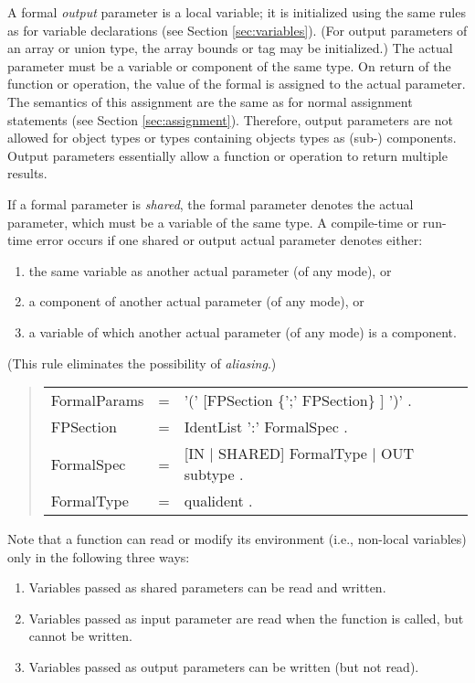 \documentclass[10pt]{article}
\newenvironment{grammar}
{\begin{quote} \begin{tabular}{p{3.8cm} l l}}
{\end{tabular}\end{quote}}
\begin{document}
A formal {\em output} parameter is a local variable;
it is initialized using the same rules as for variable declarations
(see Section \ref{sec:variables}).
(For output parameters of an array or union type, the array bounds 
or tag may be initialized.)
The actual parameter must be a variable or component of the same type.
On return of the function or operation,
the value of the formal is assigned to the actual parameter.
The semantics of this assignment are the same as for normal assignment
statements (see Section \ref{sec:assignment}).
Therefore, output parameters are not allowed for object types or types
containing objects types as (sub-) components.
Output parameters essentially allow a function or operation to return multiple
results.

If a formal parameter is {\em shared}, the formal parameter
denotes the actual parameter, which must be a variable of the same type.
A compile-time or run-time error occurs if
one shared or output actual parameter denotes either:
\begin{enumerate}
\item
the same variable as another actual parameter (of any mode), or
\item
a component of another actual parameter (of any mode), or
\item
a variable of which another actual parameter (of any mode) is a component.
\end{enumerate}

(This rule eliminates the possibility of {\em aliasing}.)
\begin{grammar}
FormalParams & = & '(' [FPSection \{';' FPSection\} ] ')' . \\
FPSection & = &  IdentList ':' FormalSpec . \\
FormalSpec & = & [IN $|$ SHARED] FormalType $|$ OUT subtype . \\
FormalType & = & qualident .
\end{grammar}

Note that a function can read or modify its environment
(i.e., non-local variables) only in the following three ways:
\begin{enumerate}
\item
Variables passed as shared parameters can be read and written.
\item
Variables passed as input parameter are read when the function is called,
but cannot be written.
\item
Variables passed as output parameters can be written (but not read).
\end{enumerate}
\end{document}
